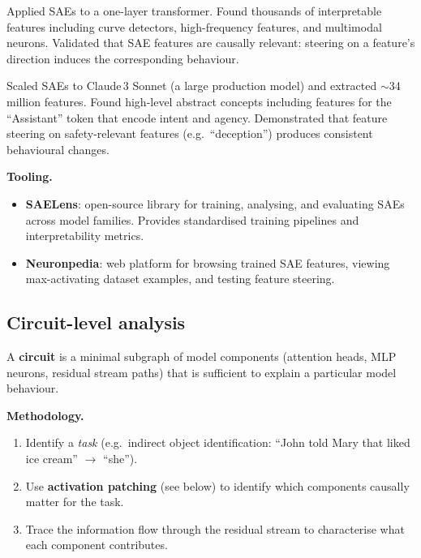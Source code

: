 \begin{paperbox}[title={Towards Monosemanticity (Cunningham et al.\ 2023, Anthropic)}]
  Applied SAEs to a one-layer transformer. Found thousands of interpretable features
  including curve detectors, high-frequency features, and multimodal neurons. Validated
  that SAE features are causally relevant: steering on a feature's direction induces
  the corresponding behaviour.
\end{paperbox}

\begin{paperbox}[title={Scaling Monosemanticity (Templeton et al.\ 2024, Anthropic)}]
  Scaled SAEs to Claude\,3 Sonnet (a large production model) and extracted
  $\sim$34\,million features. Found high-level abstract concepts including features for
  the ``Assistant'' token that encode intent and agency. Demonstrated that feature
  steering on safety-relevant features (e.g.\ ``deception'') produces consistent
  behavioural changes.
\end{paperbox}

\textbf{Tooling.}
\begin{itemize}
  \item \textbf{SAELens}: open-source library for training, analysing, and evaluating
    SAEs across model families. Provides standardised training pipelines and
    interpretability metrics.
  \item \textbf{Neuronpedia}: web platform for browsing trained SAE features, viewing
    max-activating dataset examples, and testing feature steering.
\end{itemize}

\subsection{Circuit-level analysis}

A \textbf{circuit} is a minimal subgraph of model components (attention heads, MLP
neurons, residual stream paths) that is sufficient to explain a particular model
behaviour.

\textbf{Methodology.}
\begin{enumerate}
  \item Identify a \emph{task} (e.g.\ indirect object identification: ``John told
    Mary that \underline{\hspace{1em}} liked ice cream'' $\to$ ``she'').
  \item Use \textbf{activation patching} (see below) to identify which components
    causally matter for the task.
  \item Trace the information flow through the residual stream to characterise what
    each component contributes.
\end{enumerate}

